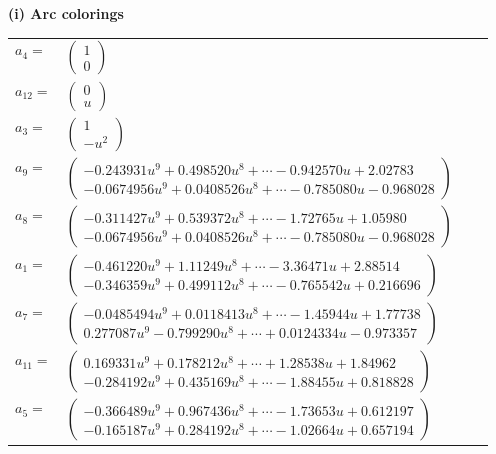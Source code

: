 \documentclass[1p]{elsarticle_modified}
\theoremstyle{definition}
\begin{document}
\flushleft \textbf{(i) Arc colorings}\\
\begin{tabular}{m{7pt} m{180pt} m{7pt} m{180pt} }
\flushright $a_{4}=$&$\begin{pmatrix}1\\0\end{pmatrix}$ \\
\flushright $a_{12}=$&$\begin{pmatrix}0\\u\end{pmatrix}$ \\
\flushright $a_{3}=$&$\begin{pmatrix}1\\- u^2\end{pmatrix}$ \\
\flushright $a_{9}=$&$\begin{pmatrix}-0.243931 u^{9}+0.498520 u^{8}+\cdots-0.942570 u+2.02783\\-0.0674956 u^{9}+0.0408526 u^{8}+\cdots-0.785080 u-0.968028\end{pmatrix}$ \\
\flushright $a_{8}=$&$\begin{pmatrix}-0.311427 u^{9}+0.539372 u^{8}+\cdots-1.72765 u+1.05980\\-0.0674956 u^{9}+0.0408526 u^{8}+\cdots-0.785080 u-0.968028\end{pmatrix}$ \\
\flushright $a_{1}=$&$\begin{pmatrix}-0.461220 u^{9}+1.11249 u^{8}+\cdots-3.36471 u+2.88514\\-0.346359 u^{9}+0.499112 u^{8}+\cdots-0.765542 u+0.216696\end{pmatrix}$ \\
\flushright $a_{7}=$&$\begin{pmatrix}-0.0485494 u^{9}+0.0118413 u^{8}+\cdots-1.45944 u+1.77738\\0.277087 u^{9}-0.799290 u^{8}+\cdots+0.0124334 u-0.973357\end{pmatrix}$ \\
\flushright $a_{11}=$&$\begin{pmatrix}0.169331 u^{9}+0.178212 u^{8}+\cdots+1.28538 u+1.84962\\-0.284192 u^{9}+0.435169 u^{8}+\cdots-1.88455 u+0.818828\end{pmatrix}$ \\
\flushright $a_{5}=$&$\begin{pmatrix}-0.366489 u^{9}+0.967436 u^{8}+\cdots-1.73653 u+0.612197\\-0.165187 u^{9}+0.284192 u^{8}+\cdots-1.02664 u+0.657194\end{pmatrix}$ \\

\end{tabular}
\end{document}
